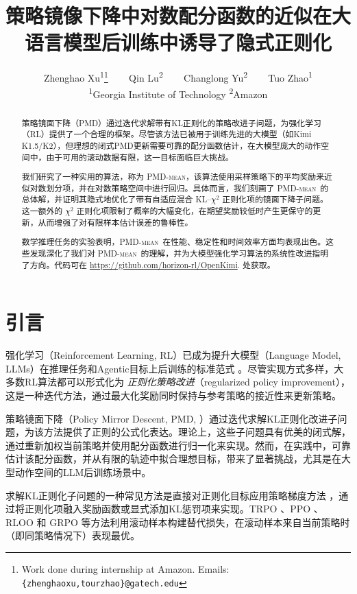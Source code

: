\documentclass{article}
\title{策略镜像下降中对数配分函数的近似在大语言模型后训练中诱导了隐式正则化}
\author{%
  Zhenghao Xu\textsuperscript{1}\thanks{Work done during internship at Amazon. Emails: \texttt{\{zhenghaoxu,tourzhao\}@gatech.edu}}
  ~~~
  Qin Lu\textsuperscript{2}
  ~~~
  Changlong Yu\textsuperscript{2}
  ~~~
  Tuo Zhao\textsuperscript{1} 
  \\
\textsuperscript{1}Georgia Institute of Technology\quad 
\textsuperscript{2}Amazon
}
\theoremstyle{plain}
\theoremstyle{definition}
\theoremstyle{remark}
\begin{document}
\maketitle


\begin{abstract}
策略镜面下降（PMD）通过迭代求解带有KL正则化的策略改进子问题，为强化学习（RL）提供了一个合理的框架。尽管该方法已被用于训练先进的大模型（如Kimi K1.5/K2），但理想的闭式PMD更新需要可靠的配分函数估计，在大模型庞大的动作空间中，由于可用的滚动数据有限，这一目标面临巨大挑战。

我们研究了一种实用的算法，称为 \textsc{PMD-mean}，该算法使用采样策略下的平均奖励来近似对数划分项，并在对数策略空间中进行回归。具体而言，我们刻画了 \textsc{PMD-mean}\ 的总体解，并证明其隐式地优化了带有自适应混合 KL--$\chi^2$  正则化项的镜面下降子问题。这一额外的 $\chi^2$  正则化项限制了概率的大幅变化，在期望奖励较低时产生更保守的更新，从而增强了对有限样本估计误差的鲁棒性。

数学推理任务的实验表明，\textsc{PMD-mean}\ 在性能、稳定性和时间效率方面均表现出色。这些发现深化了我们对 \textsc{PMD-mean}\ 的理解，并为大模型强化学习算法的系统性改进指明了方向。代码可在 \url{https://github.com/horizon-rl/OpenKimi}. 处获取。
\end{abstract}

\section{引言}
\label{sec:intro}

强化学习（Reinforcement Learning, RL）已成为提升大模型（Language Model, LLMs）在推理任务和Agentic目标上后训练的标准范式 \citep{jaech2024openai,guo2025deepseek}。尽管实现方式多样，大多数RL算法都可以形式化为 \emph{正则化策略改进}（regularized policy improvement），这是一种迭代方法，通过最大化奖励同时保持与参考策略的接近性来更新策略。

策略镜面下降（Policy Mirror Descent, PMD, \citealt{geist2019theory,tomarmirror}）通过迭代求解KL正则化改进子问题，为该方法提供了正则的公式化表达。理论上，这些子问题具有优美的闭式解，通过重新加权当前策略并使用配分函数进行归一化来实现。然而，在实践中，可靠估计该配分函数，并从有限的轨迹中拟合理想目标，带来了显著挑战，尤其是在大型动作空间的LLM后训练场景中。

求解KL正则化子问题的一种常见方法是直接对正则化目标应用策略梯度方法 \citep{williams1992simple}，通过将正则化项融入奖励函数或显式添加KL惩罚项来实现。TRPO \citep{schulman2015trust}、PPO \citep{schulman2017proximal}、RLOO \citep{ahmadian2024back} 和 GRPO \citep{shao2024deepseekmath} 等方法利用滚动样本构建替代损失，在滚动样本来自当前策略时（即同策略情况下）表现最优。
\end{document}
